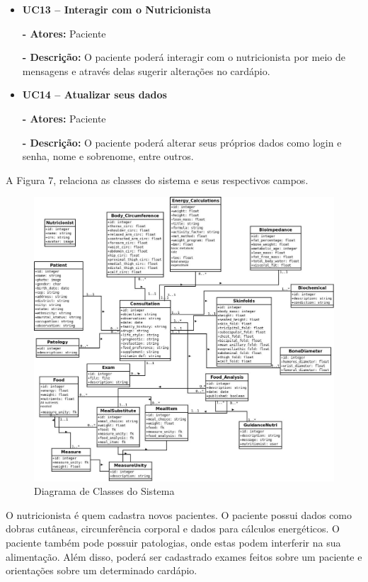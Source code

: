 \begin{itemize}
\item \textbf{UC13 – Interagir com o Nutricionista}

\textbf{- Atores:} Paciente

\textbf{- Descrição:} O paciente poderá interagir com o nutricionista por meio de mensagens e através delas sugerir alterações no cardápio.

\item \textbf{UC14 – Atualizar seus dados}

\textbf{- Atores:} Paciente

\textbf{- Descrição:} O paciente poderá alterar seus próprios dados como login e senha, nome e sobrenome, entre outros.

\end{itemize}

A Figura 7, relaciona as classes do sistema e seus respectivos campos.

\begin{figure} [hbt] 
\begin{center}
\includegraphics[width=1\textwidth]{bd-sistema.jpeg}
\end{center}
\label{diagClass1} 
\caption{Diagrama de Classes do Sistema}
\end{figure}

O nutricionista é quem cadastra novos pacientes. O paciente possui dados como
dobras cutâneas, circunferência corporal e dados para cálculos energéticos. O
paciente também pode possuir patologias, onde estas podem interferir na sua
alimentação. Além disso, poderá ser cadastrado exames feitos sobre um paciente e
orientações sobre um determinado cardápio. 

